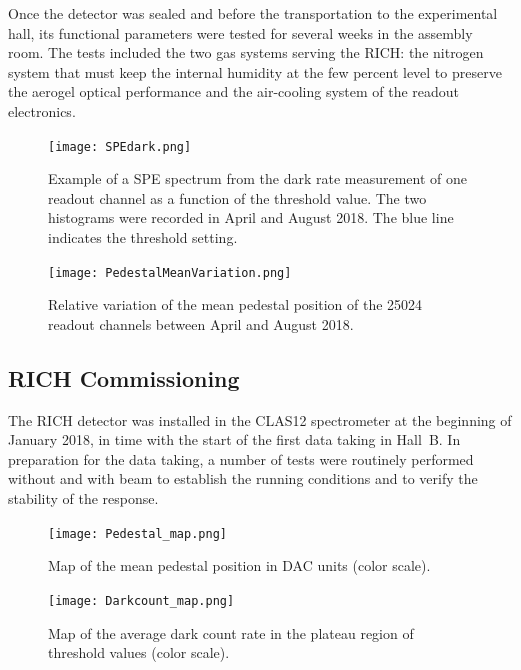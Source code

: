 \documentclass[5p,times,twocolumn]{elsarticle}
\begin{document}
Once the detector was sealed and before the transportation to the experimental hall, its functional parameters were
tested for several weeks in the assembly room. The tests included the two gas systems serving the RICH: the nitrogen
system that must keep the internal humidity at the few percent level to preserve the aerogel optical performance and
the air-cooling system of the readout electronics.

\begin{figure}[t]
\begin{center}
\texttt{[image: SPEdark.png]}
\end{center}
\caption{Example of a SPE spectrum from the dark rate measurement of one readout channel as a function of the
  threshold value. The two histograms were recorded in April and August 2018. The blue line indicates the threshold
  setting.}
\label{fig:SPEdark}
\end{figure}

\begin{figure}[t]
\begin{center}
\texttt{[image: PedestalMeanVariation.png]}
\end{center}
\caption{Relative variation of the mean pedestal position of the 25024 readout channels between April and August
  2018.}
\label{fig:PedestalMean}
\end{figure}

\subsection{RICH Commissioning}
\label{sec:Commissioning}

The RICH detector was installed in the CLAS12 spectrometer at the beginning of January 2018, in time with the start
of the first data taking in Hall~B. In preparation for the data taking, a number of tests were routinely performed without
and with beam to establish the running conditions and to verify the stability of the response.


\begin{figure}[t]
\begin{center}
\texttt{[image: Pedestal\_map.png]}
\end{center}
\caption{Map of the mean pedestal position in DAC units (color scale).}
\label{fig:PedestalMap}
\end{figure}

\begin{figure}[t]
\begin{center}
\texttt{[image: Darkcount\_map.png]}
\end{center}
\caption{Map of the average dark count rate in the plateau region of threshold values (color scale).}
\label{fig:DarkCountMap}
\end{figure}
\end{document}
